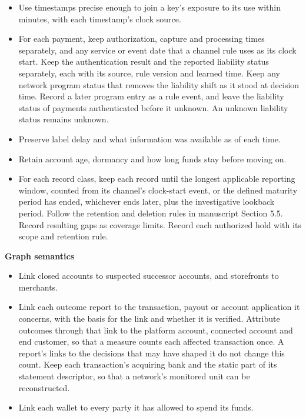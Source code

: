 \documentclass[
  11pt,
]{article}
\providecommand{\tightlist}{%
  \setlength{\itemsep}{0pt}\setlength{\parskip}{0pt}}
\renewcommand{\tightlist}{\setlength{\itemsep}{0pt plus 1pt}\setlength{\parskip}{0pt}}
\begin{document}
\begin{itemize}
\tightlist
\item
  Use timestamps precise enough to join a key's exposure to its use
  within minutes, with each timestamp's clock source.
\item
  For each payment, keep authorization, capture and processing times
  separately, and any service or event date that a channel rule uses as
  its clock start. Keep the authentication result and the reported
  liability status separately, each with its source, rule version and
  learned time. Keep any network program status that removes the
  liability shift as it stood at decision time. Record a later program
  entry as a rule event, and leave the liability status of payments
  authenticated before it unknown. An unknown liability status remains
  unknown.
\item
  Preserve label delay and what information was available as of each
  time.
\item
  Retain account age, dormancy and how long funds stay before moving on.
\item
  For each record class, keep each record until the longest applicable
  reporting window, counted from its channel's clock-start event, or the
  defined maturity period has ended, whichever ends later, plus the
  investigative lookback period. Follow the retention and deletion rules
  in manuscript Section 5.5. Record resulting gaps as coverage limits.
  Record each authorized hold with its scope and retention rule.
\end{itemize}


\textbf{Graph semantics}

\begin{itemize}
\tightlist
\item
  Link closed accounts to suspected successor accounts, and storefronts
  to merchants.
\item
  Link each outcome report to the transaction, payout or account
  application it concerns, with the basis for the link and whether it is
  verified. Attribute outcomes through that link to the platform
  account, connected account and end customer, so that a measure counts
  each affected transaction once. A report's links to the decisions that
  may have shaped it do not change this count. Keep each transaction's
  acquiring bank and the static part of its statement descriptor, so
  that a network's monitored unit can be reconstructed.
\item
  Link each wallet to every party it has allowed to spend its funds.
\end{itemize}
\end{document}
